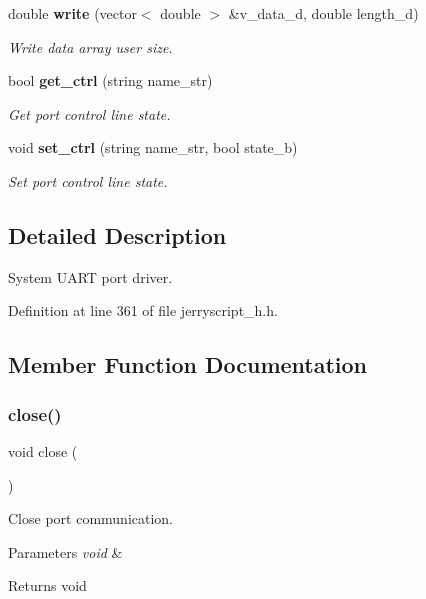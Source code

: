 \begin{DoxyCompactItemize}
double \textbf{ write} (vector$<$ double $>$ \&v\+\_\+data\+\_\+d, double length\+\_\+d)
\begin{DoxyCompactList}\small\item\em Write data array user size. \end{DoxyCompactList}\item 
bool \textbf{ get\+\_\+ctrl} (string name\+\_\+str)
\begin{DoxyCompactList}\small\item\em Get port control line state. \end{DoxyCompactList}\item 
void \textbf{ set\+\_\+ctrl} (string name\+\_\+str, bool state\+\_\+b)
\begin{DoxyCompactList}\small\item\em Set port control line state. \end{DoxyCompactList}\end{DoxyCompactItemize}


\subsection{Detailed Description}
System U\+A\+RT port driver. 

Definition at line 361 of file jerryscript\+\_\+h.\+h.



\subsection{Member Function Documentation}
\mbox{\label{classuart_a67b72387b99fb35706b11eeba7070bc4}} 
\subsubsection{close()}
{\footnotesize\ttfamily void close (\begin{DoxyParamCaption}\item[{void}]{ }\end{DoxyParamCaption})}



Close port communication. 


\begin{DoxyCode}{0}
\end{DoxyCode}



\begin{DoxyParams}{Parameters}
{\em void} & \\
\hline
\end{DoxyParams}
\begin{DoxyReturn}{Returns}
void 
\end{DoxyReturn}
\mbox{\label{classuart_a84cca1155f5d878543d5fe04da7e9154}} 
